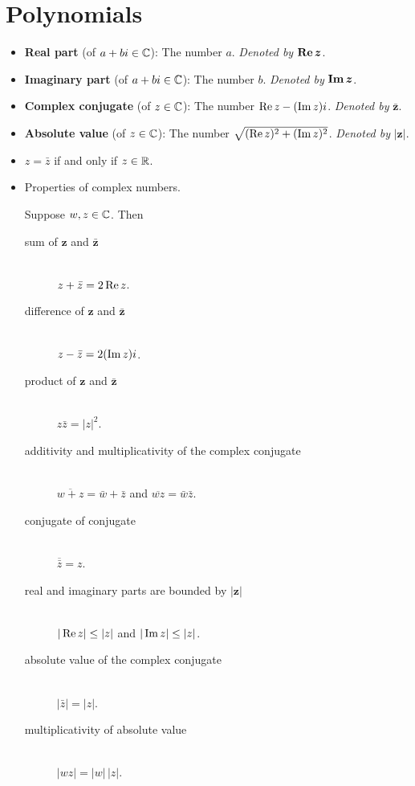 \documentclass[../main.tex]{subfiles}
\begin{document}
\chapter{Polynomials}
\begin{itemize}
    \item {}\textbf{Real part} (of $a+bi\in\mathbb{C}$): The number $a$. \emph{Denoted by} $\bm{\re z}$.
    \item \textbf{Imaginary part} (of $a+bi\in\mathbb{C}$): The number $b$. \emph{Denoted by} $\bm{\im z}$.
    \item \textbf{Complex conjugate} (of $z\in\mathbb{C}$): The number $\operatorname{Re} z-(\operatorname{Im} z)i$. \emph{Denoted by} $\bm{\bar{z}}$.
    \item \textbf{Absolute value} (of $z\in\mathbb{C}$): The number $\sqrt{(\operatorname{Re} z)^2+(\operatorname{Im} z)^2}$. \emph{Denoted by} $\bm{|z|}$.
    \item $z=\bar{z}$ if and only if $z\in\mathbb{R}$.
    \item Properties of complex numbers.
    \begin{theorem}\label{trm:propertiesComplex}
        Suppose $w,z\in\mathbb{C}$. Then
        \begin{description}
            \item[sum of $\bm{z}$ and $\bm{\bar{z}}$]\hfill\\ $z+\bar{z}=2\operatorname{Re} z$.
            \item[difference of $\bm{z}$ and $\bm{\bar{z}}$]\hfill\\ $z-\bar{z}=2(\operatorname{Im} z)i$.
            \item[product of $\bm{z}$ and $\bm{\bar{z}}$]\hfill\\ $z\bar{z}=|z|^2$.
            \item[additivity and multiplicativity of the complex conjugate]\hfill\\ $\overline{w+z}=\bar{w}+\bar{z}$ and $\overline{wz}=\bar{w}\bar{z}$.
            \item[conjugate of conjugate]\hfill\\ $\overline{\bar{z}}=z$.
            \item[real and imaginary parts are bounded by $\bm{|z|}$]\hfill\\ $|\operatorname{Re} z|\leq|z|$ and $|\operatorname{Im} z|\leq|z|$.
            \item[absolute value of the complex conjugate]\hfill\\ $|\bar{z}|=|z|$.
            \item[multiplicativity of absolute value]\hfill\\ $|wz|=|w|\,|z|$.

\end{description}
\end{theorem}
\end{itemize}
\end{document}
